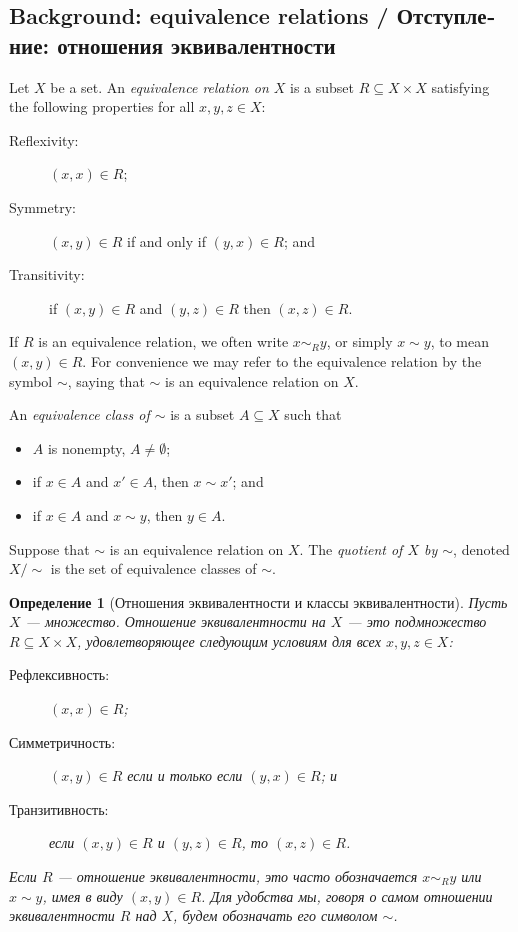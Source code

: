 \documentclass[a4paper]{book}
\def\ss{\subseteq}
\theoremstyle{myth}
\newtheorem{definitionENG}[envENG]{\begin{english}Definition\end{english}}
\newtheorem{definitionRUS}[envRUS]{Определение}
\begin{document}
\begin{russian}

\subsection{Background: equivalence relations / Отступление: отношения эквивалентности}

\begin{definitionENG}
Let $X$ be a set. An {\em equivalence relation on $X$} is a subset $R\ss X\times X$ satisfying the following properties for all $x,y,z\in X$:
\begin{description}
\item[Reflexivity:] $(x,x)\in R$;
\item[Symmetry:] $(x,y)\in R$ if and only if $(y,x)\in R$; and
\item[Transitivity:] if $(x,y)\in R$ and $(y,z)\in R$ then $(x,z)\in R$.
\end{description}
If $R$ is an equivalence relation, we often write $x\sim_R y$, or simply $x\sim y$, to mean $(x,y)\in R$. For convenience we may refer to the equivalence relation by the symbol $\sim$, saying that $\sim$ is an equivalence relation on $X$.

An {\em equivalence class of $\sim$} is a subset $A\ss X$ such that
\begin{itemize}
\item $A$ is nonempty, $A\neq\emptyset$;
\item if $x\in A$ and $x'\in A$, then $x\sim x'$; and 
\item if $x\in A$ and $x\sim y$, then $y\in A$.
\end{itemize}
Suppose that $\sim$ is an equivalence relation on $X$. The {\em quotient of $X$ by $\sim$}, denoted $X/\sim$ is the set of equivalence classes of $\sim$.
\end{definitionENG}

\begin{definitionRUS}[Отношения эквивалентности и классы эквивалентности]
Пусть $X$ — множество. {\em Отношение эквивалентности на $X$} — это подмножество $R\ss X\times X$, удовлетворяющее следующим условиям для всех $x,y,z\in X$:
\begin{description}
\item[Рефлексивность:] $(x,x)\in R$;
\item[Симметричность:] $(x,y)\in R$ если и только если $(y,x)\in R$; и
\item[Транзитивность:] если $(x,y)\in R$ и $(y,z)\in R$, то $(x,z)\in R$.
\end{description}
Если $R$ — отношение эквивалентности, это часто обозначается $x\sim_R y$ или $x\sim y$, имея в виду $(x,y)\in R$. Для удобства мы, говоря о самом отношении эквивалентности $R$ над $X$, будем обозначать его символом $\sim$.


\end{definitionRUS}
\end{russian}
\end{document}
